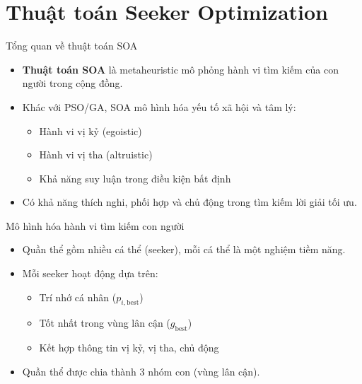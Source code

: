 \documentclass[10pt]{beamer}
\begin{document}
\section{Thuật toán Seeker Optimization}

\begin{frame}{Tổng quan về thuật toán SOA}
\begin{itemize}
    \item \textbf{Thuật toán SOA} là metaheuristic mô phỏng hành vi tìm kiếm của con người trong cộng đồng.
    \item Khác với PSO/GA, SOA mô hình hóa yếu tố xã hội và tâm lý:
    \begin{itemize}
        \item Hành vi vị kỷ (egoistic)
        \item Hành vi vị tha (altruistic)
        \item Khả năng suy luận trong điều kiện bất định
    \end{itemize}
    \item Có khả năng thích nghi, phối hợp và chủ động trong tìm kiếm lời giải tối ưu.
\end{itemize}
\end{frame}

\begin{frame}{Mô hình hóa hành vi tìm kiếm con người}
\begin{itemize}
    \item Quần thể gồm nhiều cá thể (seeker), mỗi cá thể là một nghiệm tiềm năng.
    \item Mỗi seeker hoạt động dựa trên:
    \begin{itemize}
        \item Trí nhớ cá nhân ($p_{i,\text{best}}$)
        \item Tốt nhất trong vùng lân cận ($g_{\text{best}}$)
        \item Kết hợp thông tin vị kỷ, vị tha, chủ động
    \end{itemize}
    \item Quần thể được chia thành 3 nhóm con (vùng lân cận).
\end{itemize}
\end{frame}
\end{document}
